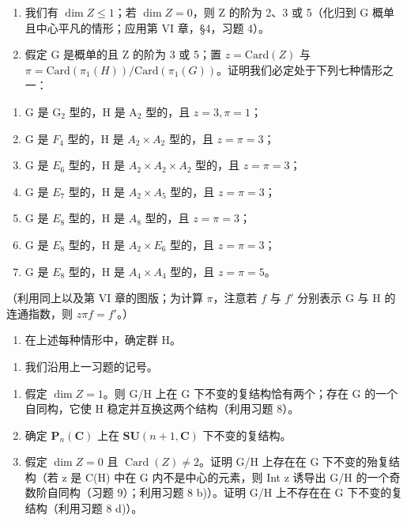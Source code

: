 \begin{enumerate}
\def\labelenumi{\alph{enumi})}
\item
  我们有 \(\dim Z \leq 1\)；若 \(\dim Z = 0\)，则 Z 的阶为 2、3 或 5（化归到 G 概单且中心平凡的情形；应用第 VI 章，§4，习题 4）。
\item
  假定 G 是概单的且 Z 的阶为 3 或 5；置 \(z = \text{Card}(Z)\) 与 \(\pi = \text{Card}(\pi_1(H))/\text{Card}(\pi_1(G))\)。证明我们必定处于下列七种情形之一：
\end{enumerate}

\begin{enumerate}
\def\labelenumi{(\roman{enumi})}
\item
  G 是 \(\mathrm{G}_2\) 型的，H 是 \(\mathrm{A}_2\) 型的，且 \(z = 3, \pi = 1\)；
\item
  G 是 \(F_{4}\) 型的，H 是 \(A_{2} \times A_{2}\) 型的，且 \(z = \pi = 3\)；
\item
  G 是 \(E_{6}\) 型的，H 是 \(A_{2} \times A_{2} \times A_{2}\) 型的，且 \(z = \pi = 3\)；
\item
  G 是 \(E_{7}\) 型的，H 是 \(A_{2} \times A_{5}\) 型的，且 \(z = \pi = 3\)；
\item
  G 是 \(E_{8}\) 型的，H 是 \(A_{8}\) 型的，且 \(z = \pi = 3\)；
\item
  G 是 \(E_{8}\) 型的，H 是 \(A_{2} \times E_{6}\) 型的，且 \(z = \pi = 3\)；
\item
  G 是 \(E_{8}\) 型的，H 是 \(A_{4} \times A_{4}\) 型的，且 \(z = \pi = 5\)。
\end{enumerate}

（利用同上以及第 VI 章的图版；为计算 \(\pi\)，注意若 \(f\) 与 \(f'\) 分别表示 G 与 H 的连通指数，则 \(z\pi f = f'\)。）

\begin{enumerate}
\def\labelenumi{\alph{enumi})}
\setcounter{enumi}{2}
\tightlist
\item
  在上述每种情形中，确定群 H。
\end{enumerate}

\begin{enumerate}
\def\labelenumi{\arabic{enumi})}
\setcounter{enumi}{9}
\tightlist
\item
  我们沿用上一习题的记号。
\end{enumerate}

\begin{enumerate}
\def\labelenumi{\alph{enumi})}
\item
  假定 \(\dim Z = 1\)。则 G/H 上在 G 下不变的复结构恰有两个；存在 G 的一个自同构，它使 H 稳定并互换这两个结构（利用习题 8）。
\item
  确定 \(\mathbf{P}_n(\mathbf{C})\) 上在 \(\mathbf{SU}(n + 1,\mathbf{C})\) 下不变的复结构。
\item
  假定 \(\dim Z = 0\) 且 \(\operatorname{Card}(Z) \neq 2\)。证明 G/H 上存在在 G 下不变的殆复结构（若 z 是 C(H) 中在 G 内不是中心的元素，则 Int z 诱导出 G/H 的一个奇数阶自同构（习题 9）；利用习题 8 b)）。证明 G/H 上不存在在 G 下不变的复结构（利用习题 8 d)）。
\end{enumerate}

